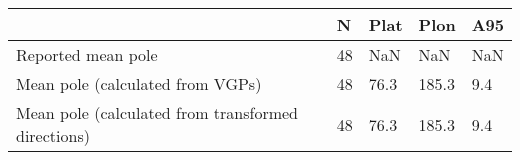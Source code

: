 \begin{tabular}{lllll}
\toprule
{} &   N &  Plat &   Plon &  A95 \\
\midrule
Reported mean pole                                 &  48 &   NaN &    NaN &  NaN \\
Mean pole (calculated from VGPs)                   &  48 &  76.3 &  185.3 &  9.4 \\
Mean pole (calculated from transformed directions) &  48 &  76.3 &  185.3 &  9.4 \\
\bottomrule
\end{tabular}
